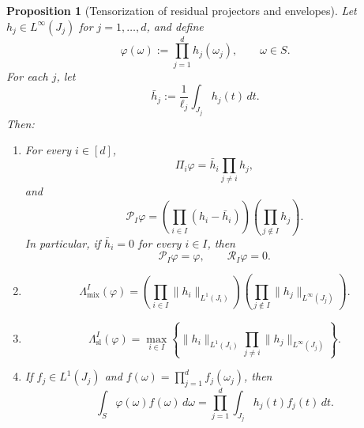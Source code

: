 \documentclass[11pt,letterpaper]{article}
\newtheorem{proposition}[theorem]{Proposition}
\theoremstyle{definition}
\theoremstyle{remark}
\begin{document}
\begin{proposition}[Tensorization of residual projectors and envelopes]
\label{prop:appendix_tensorized_projectors_envelopes}
Let $h_j\in L^\infty(J_j)$ for $j=1,\ldots,d$, and define
$$
\varphi(\omega):=\prod_{j=1}^d h_j(\omega_j),
\qquad
\omega\in S.
$$
For each $j$, let
$$
\bar h_j:=\frac1{\ell_j}\int_{J_j}h_j(t)\,dt.
$$
Then:

\begin{enumerate}
\item[\emph{(i)}] For every $i\in[d]$,
$$
\Pi_i\varphi
=
\bar h_i\prod_{j\neq i}h_j,
$$
and
\begin{equation}
\label{eq:appendix_tensorized_projector_formula}
\mathcal P_I\varphi
=
\left(\prod_{i\in I}(h_i-\bar h_i)\right)
\left(\prod_{j\notin I}h_j\right).
\end{equation}
In particular, if $\bar h_i=0$ for every $i\in I$, then
$$
\mathcal P_I\varphi=\varphi,
\qquad
\mathcal R_I\varphi=0.
$$

\item[\emph{(ii)}]
\begin{equation}
\label{eq:appendix_tensorized_mixed_envelope}
\Lambda_{\mathrm{mix}}^I(\varphi)
=
\left(\prod_{i\in I}\|h_i\|_{L^1(J_i)}\right)
\left(\prod_{j\notin I}\|h_j\|_{L^\infty(J_j)}\right).
\end{equation}

\item[\emph{(iii)}]
\begin{equation}
\label{eq:appendix_tensorized_slice_envelope}
\Lambda_{\mathrm{sl}}^I(\varphi)
=
\max_{i\in I}
\left\{
\|h_i\|_{L^1(J_i)}
\prod_{j\neq i}\|h_j\|_{L^\infty(J_j)}
\right\}.
\end{equation}

\item[\emph{(iv)}] If $f_j\in L^1(J_j)$ and
$f(\omega)=\prod_{j=1}^d f_j(\omega_j)$, then
\begin{equation}
\label{eq:appendix_tensorized_pairing}
\int_S\varphi(\omega)f(\omega)\,d\omega
=
\prod_{j=1}^d
\int_{J_j}h_j(t)f_j(t)\,dt.
\end{equation}
\end{enumerate}
\end{proposition}
\end{document}
